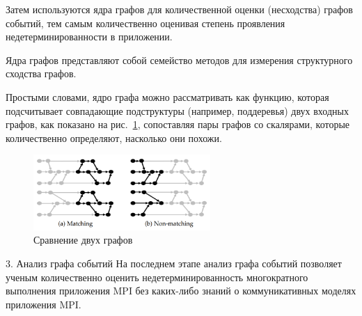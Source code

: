 Затем используются ядра графов для количественной оценки (несходства) графов событий, тем самым количественно оценивая степень проявления недетерминированности в приложении.

Ядра графов представляют собой семейство методов для измерения структурного сходства графов. 

Простыми словами, ядро графа можно рассматривать как функцию, которая подсчитывает совпадающие подструктуры (например, поддеревья) двух входных графов, как показано на рис.~\ref{lab.rndhpc2021.11.10.010}, сопоставляя пары графов со скалярами, которые количественно определяют, насколько они похожи.

\begin{figure}[h]
	\centering
	\includegraphics[width=0.6\textwidth]{ResearchNotes/rndhpc_not_edt_2021_11_10/krekhtunova/graph_comp.png}
	\caption{Сравнение двух графов}\label{lab.rndhpc2021.11.10.010}
\end{figure}

3.	Анализ графа событий
На последнем этапе анализ графа событий позволяет ученым количественно оценить недетерминированность многократного выполнения приложения MPI без каких-либо знаний о коммуникативных моделях приложения MPI.






\noteattributes{}

